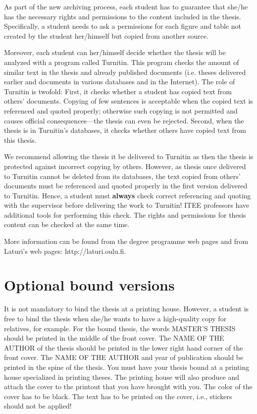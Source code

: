 As part of the new archiving process, each student has to guarantee that she/he has the necessary rights and permissions to the content included in the thesis. Specifically, a student needs to ask a permissions for each figure and table not created by the student her/himself but copied from another source.

Moreover, each student can her/himself decide whether the thesis will be analyzed with a program called Turnitin. This program checks the amount of similar text in the thesis and already published documents (i.e. theses delivered earlier and documents in various databases and in the Internet). The role of Turnitin is twofold: First, it checks whether a student has copied text from others’ documents. Copying of few sentences is acceptable when the copied text is referenced and quoted properly; otherwise such copying is not permitted and causes official consequences---the thesis can even be rejected. Second, when the thesis is in Turnitin’s databases, it checks whether others have copied text from this thesis.

We recommend allowing the thesis it be delivered to Turnitin as then the thesis is protected against incorrect copying by others. However, as thesis once delivered to Turnitin cannot be deleted from its databases, the text copied from others’ documents must be referenced and quoted properly in the first version delivered to Turnitin. Hence, a student must \textbf{always} check correct referencing and quoting with the supervisor before delivering the work to Turnitin! ITEE professors have additional tools for performing this check. The rights and permissions for thesis content can be checked at the same time.

More information can be found from the degree programme web pages \cite{mscstudies} and from Laturi’s web pages: http://laturi.oulu.fi.


\section{Optional bound versions}

It is not mandatory to bind the thesis at a printing house. However, a student is free to bind the thesis when she/he wants to have a high-quality copy for relatives, for example. For the bound thesis, the words MASTER’S THESIS should be printed in the middle of the front cover. The NAME OF THE AUTHOR of the thesis should be printed in the lower right hand corner of the front cover. The NAME OF THE AUTHOR and year of publication should be printed in the spine of the thesis. You must have your thesis bound at a printing house specialized in printing theses. The printing house will also produce and attach the cover to the printout that you have brought with you. The color of the cover has to be black. The text has to be printed on the cover, i.e., stickers should not be applied!

